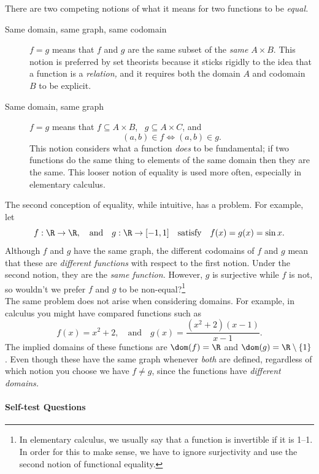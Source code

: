 \begin{aside}

There are two competing notions of what it means for two functions to be \emph{equal.}

\begin{description}
\item[Same domain, same graph, same codomain]\quad $f=g$ means that $f$ and $g$ are the same subset of the \emph{same} $A\times B$. This notion is preferred by set theorists because it sticks rigidly to the idea that a function is a \emph{relation,} and it requires both the domain $A$ and codomain $B$ to be explicit.
\item[Same domain, same graph]\quad $f=g$ means that $f\subseteq A\times B$, \ $g\subseteq A\times C$, and
\[(a,b)\in f\iff (a,b)\in g.\]
This notion considers what a function \emph{does} to be fundamental; if two functions do the same thing to elements of the same domain then they are the same. This looser notion of equality is used more often, especially in elementary calculus.
\end{description}

\noindent The second conception of equality, while intuitive, has a problem. For example, let
\[f:\R\to\R,\quad\text{and}\quad g:\R\to[-1,1]\quad\text{satisfy}\quad f(x)=g(x)=\sin x.\]
Although $f$ and $g$ have the same graph, the different codomains of $f$ and $g$ mean that these are \emph{different functions} with respect to the first notion. Under the second notion, they are the \emph{same function.} However, $g$ is surjective while $f$ is not, so wouldn't we prefer $f$ and $g$ to be non-equal?\footnote{In elementary calculus, we usually say that a function is invertible if it is 1--1. In order for this to make sense, we have to ignore surjectivity and use the second notion of functional equality.}\\


\noindent The same problem does not arise when considering domains. For example, in calculus you might have compared functions such as
\[f(x)=x^2+2,\quad\text{and}\quad g(x)=\frac{(x^2+2)(x-1)}{x-1}.\]
The implied domains of these functions are $\dom(f)=\R$ and $\dom(g)=\R\setminus\{1\}$. Even though these have the same graph whenever \emph{both} are defined, regardless of which notion you choose we have $f\neq g$, since the functions have \emph{different domains.}
\end{aside}

\paragraph{Self-test Questions}

